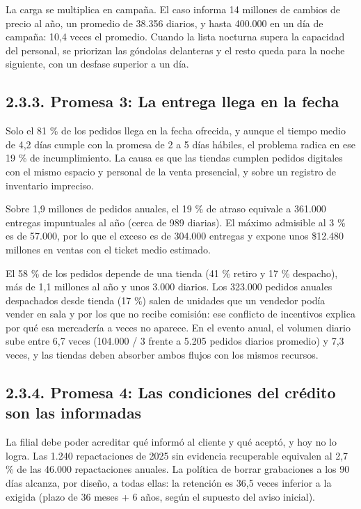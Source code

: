 \documentclass[11pt]{article}
\begin{document}
La carga se multiplica en campaña. El caso informa 14 millones de cambios de precio al año, un promedio de 38.356 diarios, y hasta 400.000 en un día de campaña: 10,4 veces el promedio. Cuando la lista nocturna supera la capacidad del personal, se priorizan las góndolas delanteras y el resto queda para la noche siguiente, con un desfase superior a un día.

\subsection{2.3.3. Promesa 3: La entrega llega en la fecha}\label{promesa-3-la-entrega-llega-en-la-fecha}

Solo el 81 \% de los pedidos llega en la fecha ofrecida, y aunque el tiempo medio de 4,2 días cumple con la promesa de 2 a 5 días hábiles, el problema radica en ese 19 \% de incumplimiento. La causa es que las tiendas cumplen pedidos digitales con el mismo espacio y personal de la venta presencial, y sobre un registro de inventario impreciso.

Sobre 1,9 millones de pedidos anuales, el 19 \% de atraso equivale a 361.000 entregas impuntuales al año (cerca de 989 diarias). El máximo admisible al 3 \% es de 57.000, por lo que el exceso es de 304.000 entregas y expone unos \$12.480 millones en ventas con el ticket medio estimado.

El 58 \% de los pedidos depende de una tienda (41 \% retiro y 17 \% despacho), más de 1,1 millones al año y unos 3.000 diarios. Los 323.000 pedidos anuales despachados desde tienda (17 \%) salen de unidades que un vendedor podía vender en sala y por los que no recibe comisión: ese conflicto de incentivos explica por qué esa mercadería a veces no aparece. En el evento anual, el volumen diario sube entre 6,7 veces (104.000 / 3 frente a 5.205 pedidos diarios promedio) y 7,3 veces, y las tiendas deben absorber ambos flujos con los mismos recursos.

\subsection{2.3.4. Promesa 4: Las condiciones del crédito son las informadas}\label{promesa-4-las-condiciones-del-cruxe9dito-son-las-informadas}

La filial debe poder acreditar qué informó al cliente y qué aceptó, y hoy no lo logra. Las 1.240 repactaciones de 2025 sin evidencia recuperable equivalen al 2,7 \% de las 46.000 repactaciones anuales. La política de borrar grabaciones a los 90 días alcanza, por diseño, a todas ellas: la retención es 36,5 veces inferior a la exigida (plazo de 36 meses + 6 años, según el supuesto del aviso inicial).
\end{document}
